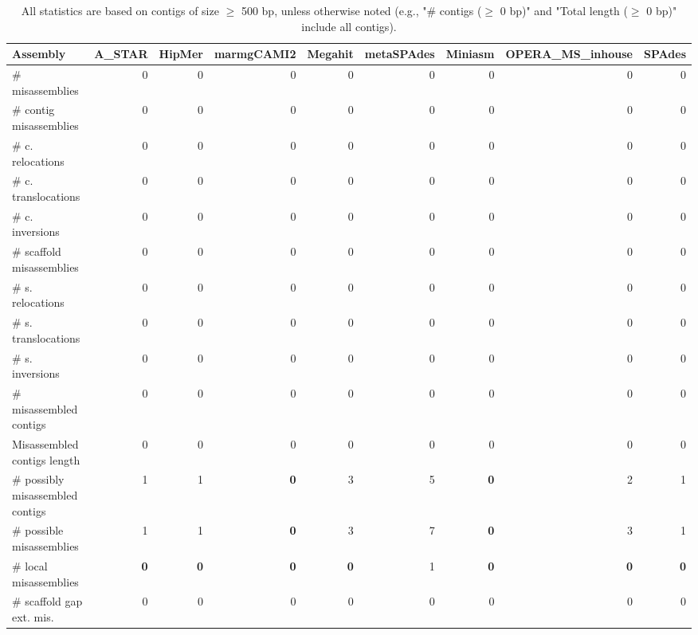 \documentclass[12pt,a4paper]{article}
\begin{document}
\begin{table}[ht]
\begin{center}
\caption{All statistics are based on contigs of size $\geq$ 500 bp, unless otherwise noted (e.g., "\# contigs ($\geq$ 0 bp)" and "Total length ($\geq$ 0 bp)" include all contigs).}
\begin{tabular}{|l*{8}{|r}|}
\hline
Assembly & A\_STAR & HipMer & marmgCAMI2 & Megahit & metaSPAdes & Miniasm & OPERA\_MS\_inhouse & SPAdes \\ \hline
\# misassemblies & 0 & 0 & 0 & 0 & 0 & 0 & 0 & 0 \\ \hline
\hspace{2mm}\# contig misassemblies & 0 & 0 & 0 & 0 & 0 & 0 & 0 & 0 \\ \hline
\hspace{5mm}\# c. relocations & 0 & 0 & 0 & 0 & 0 & 0 & 0 & 0 \\ \hline
\hspace{5mm}\# c. translocations & 0 & 0 & 0 & 0 & 0 & 0 & 0 & 0 \\ \hline
\hspace{5mm}\# c. inversions & 0 & 0 & 0 & 0 & 0 & 0 & 0 & 0 \\ \hline
\hspace{2mm}\# scaffold misassemblies & 0 & 0 & 0 & 0 & 0 & 0 & 0 & 0 \\ \hline
\hspace{5mm}\# s. relocations & 0 & 0 & 0 & 0 & 0 & 0 & 0 & 0 \\ \hline
\hspace{5mm}\# s. translocations & 0 & 0 & 0 & 0 & 0 & 0 & 0 & 0 \\ \hline
\hspace{5mm}\# s. inversions & 0 & 0 & 0 & 0 & 0 & 0 & 0 & 0 \\ \hline
\# misassembled contigs & 0 & 0 & 0 & 0 & 0 & 0 & 0 & 0 \\ \hline
Misassembled contigs length & 0 & 0 & 0 & 0 & 0 & 0 & 0 & 0 \\ \hline
\# possibly misassembled contigs & 1 & 1 & {\bf 0} & 3 & 5 & {\bf 0} & 2 & 1 \\ \hline
\hspace{5mm}\# possible misassemblies & 1 & 1 & {\bf 0} & 3 & 7 & {\bf 0} & 3 & 1 \\ \hline
\# local misassemblies & {\bf 0} & {\bf 0} & {\bf 0} & {\bf 0} & 1 & {\bf 0} & {\bf 0} & {\bf 0} \\ \hline
\# scaffold gap ext. mis. & 0 & 0 & 0 & 0 & 0 & 0 & 0 & 0 \\ \hline

\end{tabular}
\end{center}
\end{table}
\end{document}
